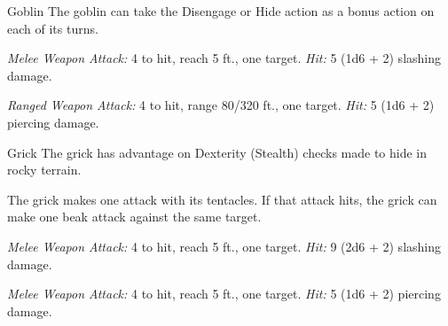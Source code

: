 \documentclass[10pt,a4paper,twoside,bg=print,twocolumn,openany,nodeprecatedcode]{dndbook}
\begin{document}
\begin{DndMonster}[float=t]{Goblin}
\DndMonsterBasics[
armor-class = {15 (\textit{leather armor})},
hit-points = {\DndDice{2d6}},
speed = {30 ft.}
]
\DndMonsterAbilityScores[
 str = 8,
 dex = 14,
 con = 10,
 int = 10,
 wis = 8,
 cha = 8
]
\DndMonsterDetails[
skills = {Stealth +6},
senses = {darkvision 60 ft., passive perception 9},
languages = {Common, Goblin},
challenge = 1/4,
]
The goblin can take the Disengage or Hide action as a bonus action on each of its turns.

\textsl{Melee Weapon Attack:} 4 to hit, reach 5 ft., one target. \textsl{Hit:} 5 (1d6 + 2) slashing damage.

\textsl{Ranged Weapon Attack:} 4 to hit, range 80/320 ft., one target. \textsl{Hit:} 5 (1d6 + 2) piercing damage.

\end{DndMonster}



\begin{DndMonster}[float=t]{Grick}
\DndMonsterBasics[
armor-class = {14 (natural armor)},
hit-points = {\DndDice{6d8}},
speed = {30 ft., climb 30 ft.}
]
\DndMonsterAbilityScores[
 str = 14,
 dex = 14,
 con = 11,
 int = 3,
 wis = 14,
 cha = 5
]
\DndMonsterDetails[
damage-resistances = {bludgeoning, piercing, slashing from nonmagical attacks},
senses = {darkvision 60 ft., passive perception 12},
challenge = 2,
]
The grick has advantage on Dexterity (Stealth) checks made to hide in rocky terrain.

The grick makes one attack with its tentacles. If that attack hits, the grick can make one beak attack against the same target.

\textsl{Melee Weapon Attack:} 4 to hit, reach 5 ft., one target. \textsl{Hit:} 9 (2d6 + 2) slashing damage.

\textsl{Melee Weapon Attack:} 4 to hit, reach 5 ft., one target. \textsl{Hit:} 5 (1d6 + 2) piercing damage.

\end{DndMonster}
\end{document}
